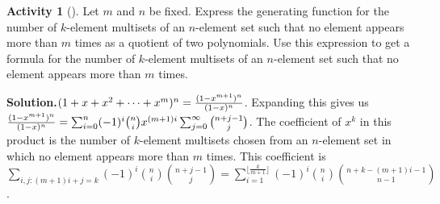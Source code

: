 \documentclass[10pt,]{book}
\theoremstyle{plain}
\theoremstyle{definition}
\newtheorem{activity}[project]{Activity}
\numberwithin{equation}{chapter}
\begin{document}
\begin{activity}[]\label{activity-202}
Let \(m\) and \(n\) be fixed. Express the generating function for the number of \(k\)-element multisets of an \(n\)-element set such that no element appears more than \(m\) times as a quotient of two polynomials. Use this expression to get a formula for the number of \(k\)-element multisets of an \(n\)-element set such that no element appears more than \(m\) times.%
\par\medskip\noindent%
\textbf{Solution.}\quad \((1+x+x^2+\cdots+x^m)^n={(1-x^{m+1})^n\over (1-x)^n}\).  Expanding this gives us \({(1-x^{m+1})^n\over (1-x)^n}=\sum_{i=0}^n(-1)^i \binom{n}{i}x^{(m+1)i} \sum_{j=0}^\infty \binom{n+j-1}{j}\). The coefficient of \(x^k\) in this product is the number of \(k\)-element multisets chosen from an \(n\)-element set in which no element appears more than \(m\) times. This coefficient is \(\sum\limits_{i,j:(m+1)i+j=k}(-1)^i\binom{n}{i}\binom{n+j-1}{j}=\sum\limits_{i=1}^{\lfloor\frac{k}{m+1}\rfloor}(-1)^i\binom{n}{i}\binom{n+k-(m+1)i-1}{n-1}\).%
\end{activity}
\end{document}
